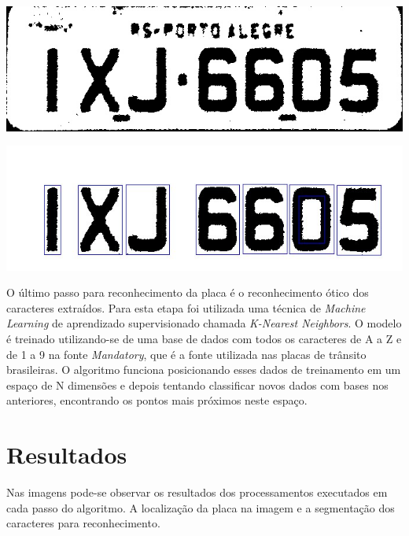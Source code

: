 \documentclass[a0,portrait]{a0poster}
\begin{document}
\begin{multicols}{2}
\vspace{2cm}

\begin{center}
	\includegraphics[width=0.70\linewidth]{a02fill_binary.jpg}
	\label{fig:plate_filled}
\end{center}

\begin{center}
	\includegraphics[width=0.70\linewidth]{character_segmentation.jpg}
	\label{fig:character_segmentation}
\end{center}

O último passo para reconhecimento da placa é o reconhecimento ótico dos
caracteres extraídos. Para esta etapa foi utilizada uma técnica de \emph{Machine Learning}
de aprendizado supervisionado chamada \emph{K-Nearest Neighbors}.
O modelo é treinado utilizando-se de uma base de dados com todos os caracteres
de A a Z e de 1 a 9 na fonte \emph{Mandatory}, que é a fonte utilizada nas placas de
trânsito brasileiras. O algoritmo funciona posicionando esses dados de treinamento
em um espaço de N dimensões e depois tentando classificar novos dados com bases nos anteriores,
encontrando os pontos mais próximos neste espaço.

\color{NavyBlue}
\section*{\huge Resultados}
\color{Black}

Nas imagens pode-se observar os resultados dos processamentos executados em cada 
passo do algoritmo. A localização da placa na imagem e a segmentação
dos caracteres para reconhecimento.


% 
% 

\end{multicols}

\end{document}
